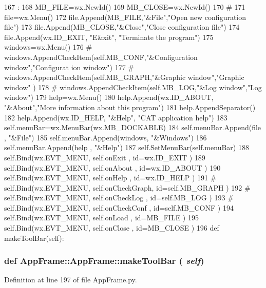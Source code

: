 \begin{DoxyCode}
167                          :
168         MB_FILE=wx.NewId()
169         MB_CLOSE=wx.NewId()
170         #
171         file=wx.Menu()
172         file.Append(MB_FILE,"&File","Open new configuration file")
173         file.Append(MB_CLOSE,"&Close","Close configuration file")
174         file.Append(wx.ID_EXIT, "E&xit", "Terminate the program")
175         windows=wx.Menu()
176 #        windows.AppendCheckItem(self.MB_CONF,"&Configuration window","Configurat
      ion window")
177 #        windows.AppendCheckItem(self.MB_GRAPH,"&Graphic window","Graphic window"
      )
178 #        windows.AppendCheckItem(self.MB_LOG,"&Log window","Log window")
179         help=wx.Menu()
180         help.Append(wx.ID_ABOUT, "&About","More information about this program")
181         help.AppendSeparator()
182         help.Append(wx.ID_HELP, "&Help", "CAT application help")
183         self.menuBar=wx.MenuBar(wx.MB_DOCKABLE)
184         self.menuBar.Append(file   , "&File")
185         self.menuBar.Append(windows, "&Windows")
186         self.menuBar.Append(help   , "&Help")
187         self.SetMenuBar(self.menuBar)
188         self.Bind(wx.EVT_MENU, self.onExit      , id=wx.ID_EXIT )
189         self.Bind(wx.EVT_MENU, self.onAbout     , id=wx.ID_ABOUT )
190         self.Bind(wx.EVT_MENU, self.onHelp      , id=wx.ID_HELP )
191 #        self.Bind(wx.EVT_MENU, self.onCheckGraph, id=self.MB_GRAPH )
192 #        self.Bind(wx.EVT_MENU, self.onCheckLog  , id=self.MB_LOG   )
193 #        self.Bind(wx.EVT_MENU, self.onCheckConf , id=self.MB_CONF  )
194         self.Bind(wx.EVT_MENU, self.onLoad      , id=MB_FILE  )
195         self.Bind(wx.EVT_MENU, self.onClose     , id=MB_CLOSE  )
196         
    def makeToolBar(self):
\end{DoxyCode}
\hypertarget{classAppFrame_1_1AppFrame_ab4a7fb9bd8d8d66ab94c61281456f8ff}{
\subsubsection[{makeToolBar}]{\setlength{\rightskip}{0pt plus 5cm}def AppFrame::AppFrame::makeToolBar ( {\em self})}}
\label{classAppFrame_1_1AppFrame_ab4a7fb9bd8d8d66ab94c61281456f8ff}


Definition at line 197 of file AppFrame.py.


